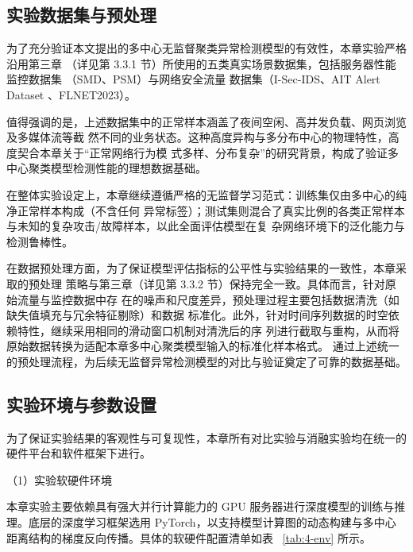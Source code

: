 \subsection{实验数据集与预处理}
\label{sec:4-dataset}
为了充分验证本文提出的多中心无监督聚类异常检测模型的有效性，本章实验严格沿用第三章
（详见第 3.3.1 节）所使用的五类真实场景数据集，包括服务器性能监控数据集
（SMD\cite{su2019robust}、PSM\cite{abdulaal2021practical}）与网络安全流量
数据集（I-Sec-IDS\cite{serinelli2023toward}、AIT Alert Dataset
\cite{landauer2024introducing}、FLNET2023\cite{tayeen2023flnet}）。

值得强调的是，上述数据集中的正常样本涵盖了夜间空闲、高并发负载、网页浏览及多媒体流等截
然不同的业务状态。这种高度异构与多分布中心的物理特性，高度契合本章关于“正常网络行为模
式多样、分布复杂”的研究背景，构成了验证多中心聚类模型检测性能的理想数据基础。

在整体实验设定上，本章继续遵循严格的无监督学习范式：训练集仅由多中心的纯净正常样本构成（不含任何
异常标签）；测试集则混合了真实比例的各类正常样本与未知的复杂攻击/故障样本，以此全面评估模型在复
杂网络环境下的泛化能力与检测鲁棒性。

在数据预处理方面，为了保证模型评估指标的公平性与实验结果的一致性，本章采取的预处理
策略与第三章（详见第 3.3.2 节）保持完全一致。具体而言，针对原始流量与监控数据中存
在的噪声和尺度差异，预处理过程主要包括数据清洗（如缺失值填充与冗余特征剔除）和数据
标准化。此外，针对时间序列数据的时空依赖特性，继续采用相同的滑动窗口机制对清洗后的序
列进行截取与重构，从而将原始数据转换为适配本章多中心聚类模型输入的标准化样本格式。
通过上述统一的预处理流程，为后续无监督异常检测模型的对比与验证奠定了可靠的数据基础。

\subsection{实验环境与参数设置}
\label{sec:4-environment}

为了保证实验结果的客观性与可复现性，本章所有对比实验与消融实验均在统一的硬件平台和软件框架下进行。

（1）实验软硬件环境

本章实验主要依赖具有强大并行计算能力的 GPU 服务器进行深度模型的训练与推理。底层的深度学习框架选用 
PyTorch，以支持模型计算图的动态构建与多中心距离结构的梯度反向传播。具体的软硬件配置清单如表~
\ref{tab:4-env} 所示。

